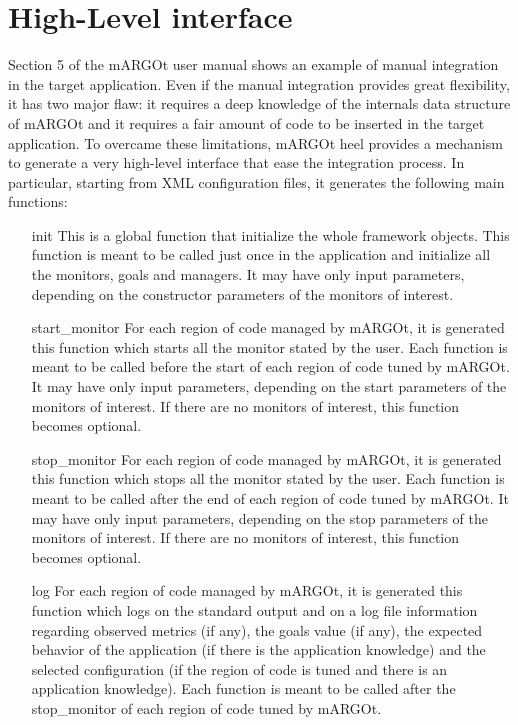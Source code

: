 \section{High-Level interface}

Section 5 of the mARGOt user manual shows an example of manual integration in the target application.
Even if the manual integration provides great flexibility, it has two major flaw: it requires a deep knowledge of the internals data structure of mARGOt and it requires a fair amount of code to be inserted in the target application.
To overcame these limitations, mARGOt heel provides a mechanism to generate a very high-level interface that ease the integration process.
In particular, starting from XML configuration files, it generates the following main functions:
\begin{itemize}
	\item[init] This is a global function that initialize the whole framework objects.
	This function is meant to be called just once in the application and initialize all the monitors, goals and managers.
	It may have only input parameters, depending on the constructor parameters of the monitors of interest.
	\item[start\_monitor] For each region of code managed by mARGOt, it is generated this function which starts all the monitor stated by the user.
	Each function is meant to be called before the start of each region of code tuned by mARGOt.
	It may have only input parameters, depending on the start parameters of the monitors of interest.
	If there are no monitors of interest, this function becomes optional.
	\item[stop\_monitor] For each region of code managed by mARGOt, it is generated this function which stops all the monitor stated by the user.
	Each function is meant to be called after the end of each region of code tuned by mARGOt.
	It may have only input parameters, depending on the stop parameters of the monitors of interest.
	If there are no monitors of interest, this function becomes optional.
	\item[log] For each region of code managed by mARGOt, it is generated this function which logs on the standard output and on a log file information regarding observed metrics (if any), the goals value (if any), the expected behavior of the application (if there is the application knowledge) and the selected configuration (if the region of code is tuned and there is an application knowledge).
	Each function is meant to be called after the stop\_monitor of each region of code tuned by mARGOt.

\end{itemize}
